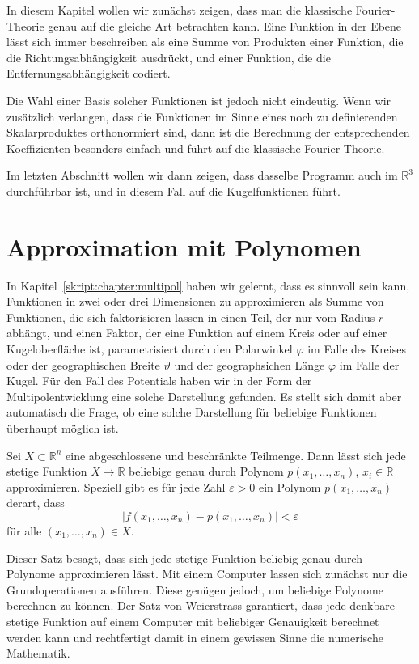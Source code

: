 In diesem Kapitel wollen wir zunächst zeigen, dass man die klassische
Fourier-Theorie genau auf die gleiche Art betrachten kann.
Eine Funktion in der Ebene lässt sich immer beschreiben als eine Summe
von Produkten einer Funktion, die die Richtungsabhängigkeit ausdrückt,
und einer Funktion, die die Entfernungsabhängigkeit codiert.

Die Wahl einer Basis solcher Funktionen ist jedoch nicht eindeutig.
Wenn wir zusätzlich verlangen, dass die Funktionen im Sinne eines noch
zu definierenden Skalarproduktes orthonormiert sind, dann ist die
Berechnung der entsprechenden Koeffizienten besonders einfach und
führt auf die klassische Fourier-Theorie.

Im letzten Abschnitt wollen wir dann zeigen, dass dasselbe Programm
auch im $\mathbb R^3$ durchführbar ist, und in diesem Fall auf die
Kugelfunktionen führt.

\section{Approximation mit Polynomen
\label{skript:section:approximation}}
In Kapitel~\ref{skript:chapter:multipol} haben wir gelernt, dass es
sinnvoll sein kann, Funktionen in zwei oder drei Dimensionen zu 
approximieren als Summe von Funktionen, die sich faktorisieren lassen
in einen Teil, der nur vom Radius $r$ abhängt, und einen Faktor,
der eine Funktion auf einem Kreis oder auf einer Kugeloberfläche
ist, parametrisiert durch den Polarwinkel $\varphi$ im Falle des
Kreises oder der geographischen Breite $\vartheta$ und der geographsichen
Länge $\varphi$ im Falle der Kugel.
Für den Fall des Potentials haben wir in der Form der Multipolentwicklung
eine solche Darstellung gefunden.
Es stellt sich damit aber automatisch die Frage, ob eine solche
Darstellung für beliebige Funktionen überhaupt möglich ist.

\begin{satz}[Weierstrass]
\label{skript:satz:weierstrass}
Sei $X\subset\mathbb R^n$ eine abgeschlossene und beschränkte Teilmenge.
Dann lässt sich jede stetige Funktion $X\to\mathbb R$ beliebige genau durch
Polynom $p(x_1,\dots,x_n)$, $x_i\in\mathbb R$
approximieren.
Speziell gibt es für jede Zahl $\varepsilon>0$ ein Polynom $p(x_1,\dots,x_n)$
derart, dass
\[
|f(x_1,\dots,x_n)- p(x_1,\dots,x_n)|<\varepsilon
\]
für alle $(x_1,\dots,x_n)\in X$.
\end{satz}
%

Dieser Satz besagt, dass sich jede stetige Funktion beliebig genau durch
Polynome approximieren lässt. 
Mit einem Computer lassen sich zunächst nur die Grundoperationen ausführen.
Diese genügen jedoch, um beliebige Polynome berechnen zu können.
Der Satz von Weierstrass garantiert, dass jede denkbare stetige Funktion
auf einem Computer mit beliebiger Genauigkeit berechnet werden kann
und rechtfertigt damit in einem gewissen Sinne die numerische Mathematik.

